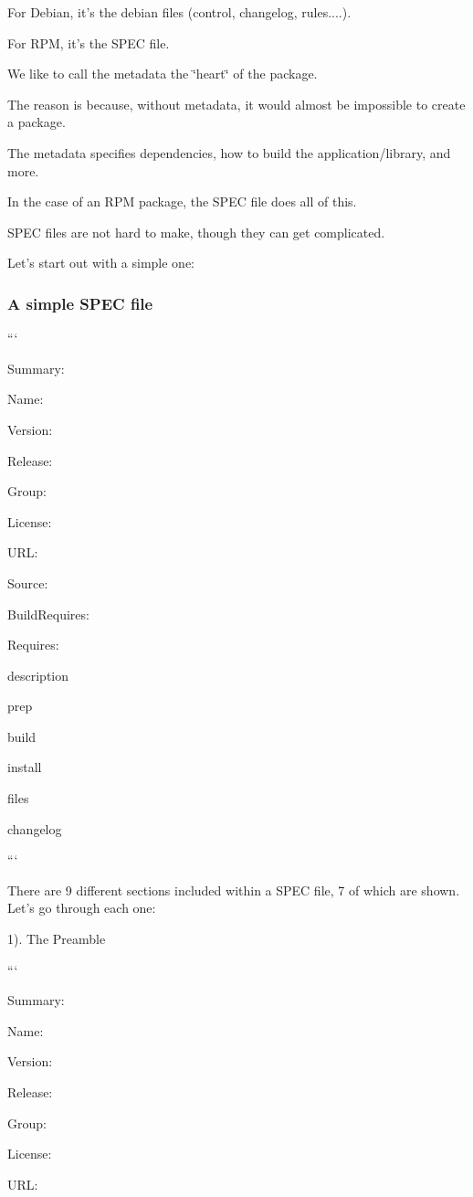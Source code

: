 For Debian, it's the debian files (control, changelog, rules....).

For R\-P\-M, it's the S\-P\-E\-C file.

We like to call the metadata the \char`\"{}heart\char`\"{} of the package.

The reason is because, without metadata, it would almost be impossible to create a package.

The metadata specifies dependencies, how to build the application/library, and more.

In the case of an R\-P\-M package, the S\-P\-E\-C file does all of this.

S\-P\-E\-C files are not hard to make, though they can get complicated.

Let's start out with a simple one\-:

\subsubsection*{A simple S\-P\-E\-C file}

```

Summary\-:

Name\-:

Version\-:

Release\-:

Group\-:

License\-:

U\-R\-L\-:

Source\-:

Build\-Requires\-:

Requires\-:

description

prep

build

install

files

changelog

```

There are 9 different sections included within a S\-P\-E\-C file, 7 of which are shown. Let's go through each one\-:

1). The Preamble

```

Summary\-:

Name\-:

Version\-:

Release\-:

Group\-:

License\-:

U\-R\-L\-:

